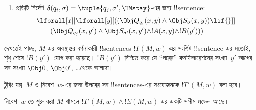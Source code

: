 \documentclass[../../../include/open-logic-section]{subfiles}
\begin{document}
\begin{enumerate}
\begin{enumerate}
\item {} প্রতিটি নির্দেশ
$\delta(q_i,\sigma)=\tuple{q_j,\sigma',\TMstay}$-এর জন্য !!{sentence}:
\begin{align*}
& \lforall[x][\lforall[y][(
   (\Obj Q_{q_i}(x, y) \land \Obj S_{\sigma}(x, y)) \lif {}]] \\
&\qquad (\Obj Q_{q_j}(x, y') \land \Obj S_{\sigma'}(x, y') \land
!A(x, y) \land !B(y')))
\end{align*}
\end{enumerate}
দেখতেই পাচ্ছ, $M$-এর অবস্থান্তর বর্ণনাকারী !!{sentence}s
$!T(M,w)$-এর সংশ্লিষ্ট !!{sentence}-এর মতোই, শুধু শেষে $!B(y')$ যোগ করা
হয়েছে। $!B(y')$ নিশ্চিত করে যে “পরের” কনফিগারেশনের সংখ্যা~$y'$ আগের
সব সংখ্যা $\Obj 0$, $\Obj 0'$, \dots থেকে আলাদা।
\end{enumerate}
টুরিং যন্ত্র~$M$ ও নিবেশ~$w$-এর জন্য উপরের সব !!{sentence}s-এর সংযোজনকে
$!T'(M,w)$ বলা হবে।

\begin{lem}
  নিবেশ~$w$-তে শুরু করা $M$ থামলে
  $!T'(M,w)\land !E(M,w)$-এর একটি সসীম মডেল আছে।
\end{lem}
\end{document}
